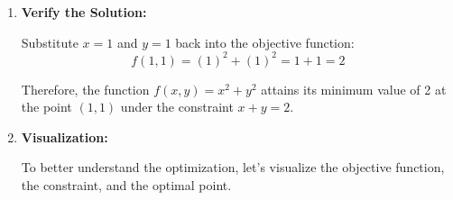 \begin{example}
\begin{solution}
\begin{enumerate}
    Substitute \( x = y \) into equation (3):
    \[
    x + x = 2 \quad \Rightarrow \quad 2x = 2 \quad \Rightarrow \quad x = 1
    \]
    
    Since \( x = y \):
    \[
    y = 1
    \]
    
    Thus, the critical point is \( (x, y) = (1, 1) \).
    
    \item \textbf{Verify the Solution:}
    
    Substitute \( x = 1 \) and \( y = 1 \) back into the objective function:
    \[
    f(1, 1) = (1)^2 + (1)^2 = 1 + 1 = 2
    \]
    
    Therefore, the function \( f(x, y) = x^2 + y^2 \) attains its minimum value of 2 at the point \( (1, 1) \) under the constraint \( x + y = 2 \).
    
    \item \textbf{Visualization:}
    
    To better understand the optimization, let's visualize the objective function, the constraint, and the optimal point.
    
    \begin{figure}[H]
        \centering
\end{figure}
\end{enumerate}
\end{solution}
\end{example}
